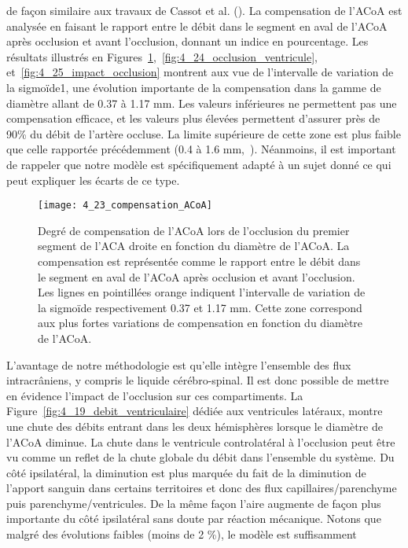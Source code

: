 de façon similaire aux travaux de Cassot et al. (\cite{Cassot1995}). La compensation de l’ACoA est analysée en faisant
le rapport entre le débit dans le segment en aval de l’ACoA après occlusion et avant l’occlusion,
donnant un indice en pourcentage. Les résultats illustrés en Figures~\ref{fig:4_23_compensation_ACoA},~\ref{fig:4_24_occlusion_ventricule}, et~\ref{fig:4_25_impact_occlusion} montrent aux vue de l’intervalle
de variation de la sigmoïde1, une évolution importante de la compensation dans la gamme de diamètre
allant de 0.37 à 1.17 mm. Les valeurs inférieures ne permettent pas une compensation efficace, et les
valeurs plus élevées permettent d’assurer près de 90\% du débit de l’artère occluse. La limite supérieure
de cette zone est plus faible que celle rapportée précédemment (0.4 à 1.6 mm,~\cite{Cassot1995}). Néanmoins, il est
important de rappeler que notre modèle est spécifiquement adapté à un sujet donné ce qui peut
expliquer les écarts de ce type.\\
\begin{figure}[!t]
\centering
\texttt{[image: 4\_23\_compensation\_ACoA]}
\caption{ Degré de compensation de l'ACoA lors de l'occlusion du premier segment de l'ACA droite en fonction du diamètre
de l'ACoA. La compensation est représentée comme le rapport entre le débit dans le segment en aval de l’ACoA après
occlusion et avant l’occlusion. Les lignes en pointillées orange indiquent l’intervalle de variation de la sigmoïde
respectivement 0.37 et 1.17 mm. Cette zone correspond aux plus fortes variations de compensation en fonction du diamètre
de l’ACoA.}
\label{fig:4_23_compensation_ACoA}	
\end{figure}
L’avantage de notre méthodologie est qu’elle intègre l’ensemble des flux intracrâniens, y
compris le liquide cérébro-spinal. Il est donc possible de mettre en évidence l’impact de l’occlusion sur
ces compartiments. La Figure~\ref{fig:4_19_debit_ventriculaire} dédiée aux ventricules latéraux, montre une chute des débits entrant
dans les deux hémisphères lorsque le diamètre de l’ACoA diminue. La chute dans le ventricule
controlatéral à l’occlusion peut être vu comme un reflet de la chute globale du débit dans l’ensemble
du système. Du côté ipsilatéral, la diminution est plus marquée du fait de la diminution de l’apport
sanguin dans certains territoires et donc des flux capillaires/parenchyme puis parenchyme/ventricules.
De la même façon l’aire augmente de façon plus importante du côté ipsilatéral sans doute par réaction
mécanique. Notons que malgré des évolutions faibles (moins de 2 \%), le modèle est suffisamment
